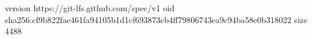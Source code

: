 version https://git-lfs.github.com/spec/v1
oid sha256:cf9b822fae461fa94105b1d1cf693873cb4ff79806743ea9c94ba58e0b318022
size 4488
